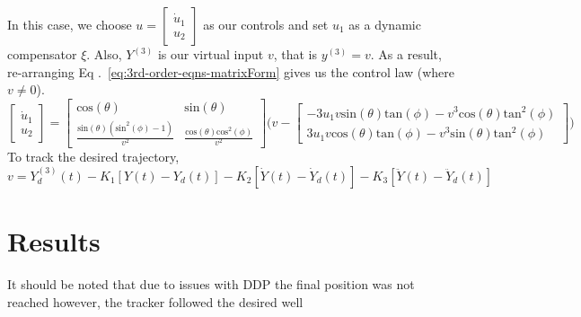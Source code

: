 \documentclass[letterpaper, 12pt]{article}
\begin{document}
In this case, we choose $u = \begin{bmatrix}
  \dot{u}_1\\
  u_2
\end{bmatrix}$ as our controls and set $u_1$ as a dynamic compensator $\xi$. Also, $Y^{(3)}$ is our virtual input $v$, that is $y^{(3)} = v$. As a result, re-arranging Eq .~\ref{eq:3rd-order-eqns-matrixForm} gives us the control law (where $v\neq 0$).
\begin{equation}
    \begin{bmatrix}
      \dot{u}_1\\
      u_2
    \end{bmatrix} = 
    \begin{bmatrix}
      \text{cos}(\theta) & \text{sin}(\theta)\\
      \frac{\text{sin}(\theta)(\text{sin}^2(\phi)-1)}{v^2} & \frac{\text{cos}(\theta)\text{cos}^2(\phi)}{v^2} 
    \end{bmatrix}
    \Bigg(v - 
  \begin{bmatrix}
      -3u_1v\text{sin}(\theta)\text{tan}(\phi) - v^3\text{cos}(\theta)\text{tan}^2(\phi)\\
      3u_1v\text{cos}(\theta)\text{tan}(\phi) - v^3\text{sin}(\theta)\text{tan}^2(\phi)
  \end{bmatrix}
  \Bigg)
\end{equation}
To track the desired trajectory,
\begin{equation}
    v = Y^{(3)}_d(t) - K_1 [Y(t) - Y_d(t)] - K_2[\dot{Y}(t) - \dot{Y}_d(t)] - K_3[\ddot{Y}(t) - \ddot{Y}_d(t)]
\end{equation}
\section{Results}
It should be noted that due to issues with DDP the final position was not reached however, the tracker followed the desired well
\end{document}

